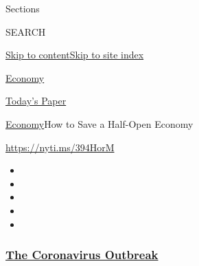 Sections

SEARCH

\protect\hyperlink{site-content}{Skip to
content}\protect\hyperlink{site-index}{Skip to site index}

\href{https://www.nytimes3xbfgragh.onion/section/business/economy}{Economy}

\href{https://myaccount.nytimes3xbfgragh.onion/auth/login?response_type=cookie\&client_id=vi}{}

\href{https://www.nytimes3xbfgragh.onion/section/todayspaper}{Today's
Paper}

\href{/section/business/economy}{Economy}\textbar{}How to Save a
Half-Open Economy

\url{https://nyti.ms/394HorM}

\begin{itemize}
\item
\item
\item
\item
\item
\end{itemize}

\hypertarget{the-coronavirus-outbreak}{%
\subsubsection{\texorpdfstring{\href{https://www.nytimes3xbfgragh.onion/news-event/coronavirus?name=styln-coronavirus-markets\&region=TOP_BANNER\&variant=undefined\&block=storyline_menu_recirc\&action=click\&pgtype=Article\&impression_id=118e8600-e3aa-11ea-98f9-47cef13f5a6f}{The
Coronavirus
Outbreak}}{The Coronavirus Outbreak}}\label{the-coronavirus-outbreak}}

